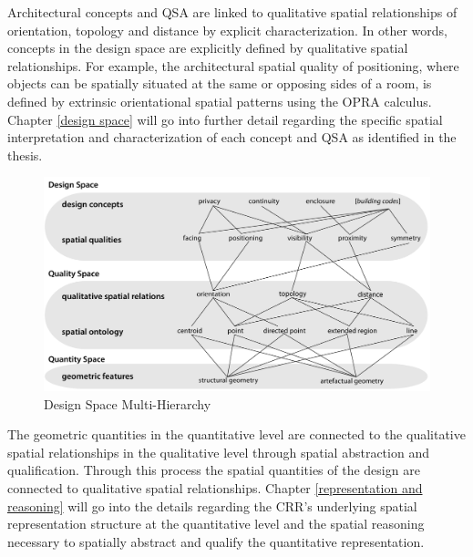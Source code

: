 \documentclass[12pt]{ucthesis}
\begin{document}
Architectural concepts and QSA are linked to qualitative spatial relationships of orientation, topology and distance by explicit characterization. In other words, concepts in the design space are explicitly defined by qualitative spatial relationships. For example, the architectural spatial quality of positioning, where objects can be spatially situated at the same or opposing sides of a room, is defined by extrinsic orientational spatial patterns using the OPRA calculus. Chapter \ref{design space} will go into further detail regarding the specific spatial interpretation and characterization of each concept and QSA as identified in the thesis.

\begin{figure}[t]
\centering
\includegraphics[width=140mm]{spatial-qualities-hierarchy}
\caption{Design Space Multi-Hierarchy}
\label{hierarchy}
\end{figure}

The geometric quantities in the quantitative level are connected to the qualitative spatial relationships in the qualitative level through spatial abstraction and qualification. Through this process the spatial quantities of the design are connected to qualitative spatial relationships. Chapter \ref{representation and reasoning}  will go into the details regarding the CRR's underlying spatial representation structure at the quantitative level and the spatial reasoning necessary to spatially abstract and qualify the quantitative representation.  
\end{document}
